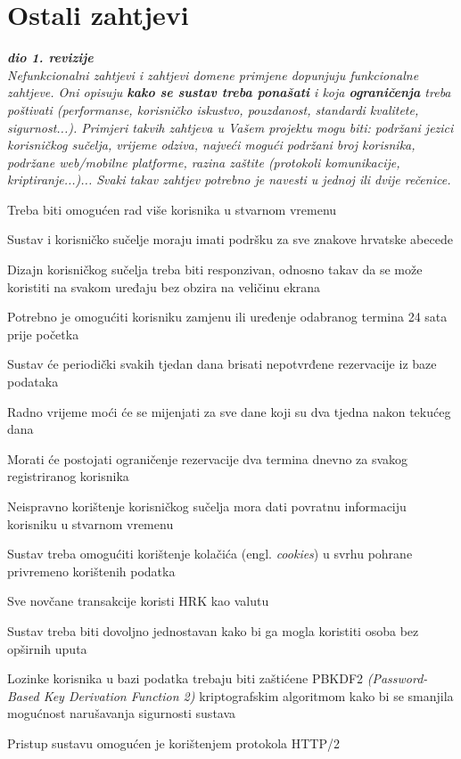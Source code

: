 \section{Ostali zahtjevi}

\textbf{\textit{dio 1. revizije}}\\

\textit{Nefunkcionalni zahtjevi i zahtjevi domene primjene dopunjuju funkcionalne zahtjeve. Oni opisuju \textbf{kako se sustav treba ponašati} i koja \textbf{ograničenja} treba poštivati (performanse, korisničko iskustvo, pouzdanost, standardi kvalitete, sigurnost...). Primjeri takvih zahtjeva u Vašem projektu mogu biti: podržani jezici korisničkog sučelja, vrijeme odziva, najveći mogući podržani broj korisnika, podržane web/mobilne platforme, razina zaštite (protokoli komunikacije, kriptiranje...)... Svaki takav zahtjev potrebno je navesti u jednoj ili dvije rečenice.}

\begin{packed_item}
	\item Treba biti omogućen rad više korisnika u stvarnom vremenu
	\item Sustav i korisničko sučelje moraju imati podršku za sve znakove hrvatske abecede
	\item Dizajn korisničkog sučelja treba biti responzivan, odnosno takav da se može koristiti na svakom uređaju bez obzira na veličinu ekrana
	\item Potrebno je omogućiti korisniku zamjenu ili uređenje odabranog termina 24 sata prije početka
	\item Sustav će periodički svakih tjedan dana brisati nepotvrđene rezervacije iz baze podataka
	\item Radno vrijeme moći će se mijenjati za sve dane koji su dva tjedna nakon tekućeg dana
	\item Morati će postojati ograničenje rezervacije dva termina dnevno za svakog registriranog korisnika
	\item Neispravno korištenje korisničkog sučelja mora dati povratnu informaciju korisniku u stvarnom vremenu
	\item Sustav treba omogućiti korištenje kolačića (engl. \textit{cookies}) u svrhu pohrane privremeno korištenih podatka
	\item Sve novčane transakcije koristi HRK kao valutu
	\item Sustav treba biti dovoljno jednostavan kako bi ga mogla koristiti osoba bez opširnih uputa
	\item Lozinke korisnika u bazi podatka trebaju biti zaštićene PBKDF2 \textit{(Password-Based Key Derivation Function 2)}
kriptografskim algoritmom kako bi se smanjila mogućnost narušavanja sigurnosti sustava
	\item Pristup sustavu omogućen je korištenjem protokola HTTP/2
	
\end{packed_item}


